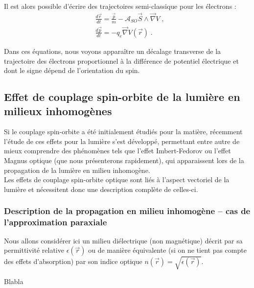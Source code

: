 \documentclass[a4paper,11pt]{article} %
\newenvironment{encart}[1]{%
	\begin{tcolorbox}
		[
		breakable, enhanced jigsaw, %
		arc = 1mm, %
		title = \textbf{#1}, %
		coltitle = white, %
		colbacktitle = blue, %
		colback = white, %
		colframe = blue %
		]
}{		
	\end{tcolorbox}
}
\begin{document}
	Il est alors possible d'écrire des trajectoires semi-classique pour les électrons :
	\begin{align}
		& \frac{d\vec{r}}{dt} = \frac{\vec{p}}{m} - \mathcal{A}_{SO} \vec{S} \wedge \vec{\nabla} V \; , \label{eq_mvt_SHE_r} \\
		& \frac{d \vec{p}}{dt} = - q_e \vec{\nabla} V(\vec{r}) \; . \label{eq_mvt_SHE_p}
	\end{align}

	Dans ces équations, nous voyons apparaître un décalage transverse de la trajectoire des électrons proportionnel à la différence de potentiel électrique et dont le signe dépend de l'orientation du spin.
	
	
	\subsection{Effet de couplage spin-orbite de la lumière en milieux inhomogènes}
	Si le couplage spin-orbite a été initialement étudiés pour la matière, récemment l'étude de ces effets pour la lumière s'est développé, permettant entre autre de mieux comprendre des phénomènes tels que l'effet Imbert-Fedorov ou l'effet Magnus optique (que nous présenterons rapidement), qui apparaissent lors de la propagation de la lumière en milieu inhomogène.\\
	
	Les effets de couplage spin-orbite optique sont liés à l'aspect vectoriel de la lumière et nécessitent donc une description complète de celles-ci. 
	
	
	\subsubsection{Description de la propagation en milieu inhomogène -- cas de l'approximation paraxiale}
	Nous allons considérer ici un milieu diélectrique (non magnétique) décrit par sa permittivité relative $ \epsilon(\vec{r}) $ ou de manière équivalente (si on ne tient pas compte des effets d'absorption) par son indice optique $ n(\vec{r}) = \sqrt{\epsilon(\vec{r})} $.\\
	
	\begin{encart}{Activité pédagogique 1 : réflection de la lumière à une interface}
		Blabla
	\end{encart}
\end{document}
